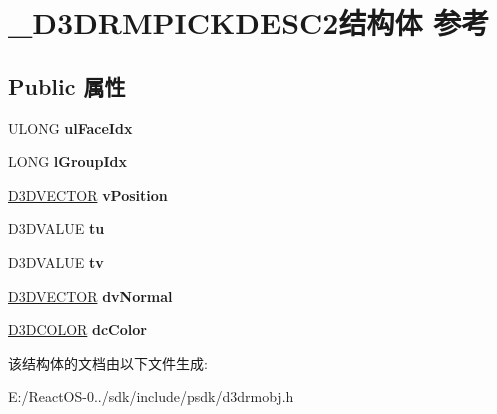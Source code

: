 \hypertarget{struct___d3_d_r_m_p_i_c_k_d_e_s_c2}{}\section{\+\_\+\+D3\+D\+R\+M\+P\+I\+C\+K\+D\+E\+S\+C2结构体 参考}
\label{struct___d3_d_r_m_p_i_c_k_d_e_s_c2}
\subsection*{Public 属性}
\begin{DoxyCompactItemize}
\item 
\mbox{\label{struct___d3_d_r_m_p_i_c_k_d_e_s_c2_ab8606283d8cbb3aa89caa270535dddbe}} 
U\+L\+O\+NG {\bfseries ul\+Face\+Idx}
\item 
\mbox{\label{struct___d3_d_r_m_p_i_c_k_d_e_s_c2_a811a9e417eb9f1b0fc1b4dcc3712b7e3}} 
L\+O\+NG {\bfseries l\+Group\+Idx}
\item 
\mbox{\label{struct___d3_d_r_m_p_i_c_k_d_e_s_c2_aaf0f85fe4aa6d97e5ac2f196ddd67c73}} 
\hyperlink{struct___d3_d_v_e_c_t_o_r}{D3\+D\+V\+E\+C\+T\+OR} {\bfseries v\+Position}
\item 
\mbox{\label{struct___d3_d_r_m_p_i_c_k_d_e_s_c2_ab07a92001059b4484fcd5536077f4a7a}} 
D3\+D\+V\+A\+L\+UE {\bfseries tu}
\item 
\mbox{\label{struct___d3_d_r_m_p_i_c_k_d_e_s_c2_a1660273e8ceb242c2a112624e1029aa9}} 
D3\+D\+V\+A\+L\+UE {\bfseries tv}
\item 
\mbox{\label{struct___d3_d_r_m_p_i_c_k_d_e_s_c2_a6586380fd21742b67b6ab2b98fefb755}} 
\hyperlink{struct___d3_d_v_e_c_t_o_r}{D3\+D\+V\+E\+C\+T\+OR} {\bfseries dv\+Normal}
\item 
\mbox{\label{struct___d3_d_r_m_p_i_c_k_d_e_s_c2_aea4a600248331252f956dddc587db189}} 
\hyperlink{struct_d3_d_c_o_l_o_r}{D3\+D\+C\+O\+L\+OR} {\bfseries dc\+Color}
\end{DoxyCompactItemize}


该结构体的文档由以下文件生成\+:\begin{DoxyCompactItemize}
\item 
E\+:/\+React\+O\+S-\/0../sdk/include/psdk/d3drmobj.\+h\end{DoxyCompactItemize}

